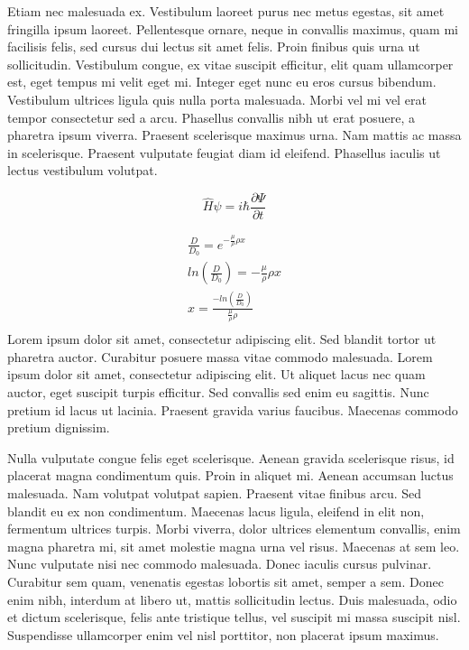 \documentclass[12pt]{article}
\begin{document}
Etiam nec malesuada ex. Vestibulum laoreet purus nec metus egestas, sit amet fringilla ipsum laoreet. Pellentesque ornare, neque in convallis maximus, quam mi facilisis felis, sed cursus dui lectus sit amet felis. Proin finibus quis urna ut sollicitudin. Vestibulum congue, ex vitae suscipit efficitur, elit quam ullamcorper est, eget tempus mi velit eget mi. Integer eget nunc eu eros cursus bibendum. Vestibulum ultrices ligula quis nulla porta malesuada. Morbi vel mi vel erat tempor consectetur sed a arcu. Phasellus convallis nibh ut erat posuere, a pharetra ipsum viverra. Praesent scelerisque maximus urna. Nam mattis ac massa in scelerisque. Praesent vulputate feugiat diam id eleifend. Phasellus iaculis ut lectus vestibulum volutpat.

\begin{equation} %
     \hat{H} \psi = i \hbar \frac{\partial \Psi}{\partial t}
\end{equation}

\begin{align} %
     \frac{D}{D_0} = e^{-\frac{\mu}{\rho}\rho x} \\
    ln\left(\frac{D}{D_0}\right) = -\frac{\mu}{\rho}\rho x \\
    x = \frac{-ln\left(\frac{D}{D_0}\right)}{\frac{\mu}{\rho}\rho} \\
\end{align}
Lorem ipsum dolor sit amet, consectetur adipiscing elit. Sed blandit tortor ut pharetra auctor. Curabitur posuere massa vitae commodo malesuada. Lorem ipsum dolor sit amet, consectetur adipiscing elit. Ut aliquet lacus nec quam auctor, eget suscipit turpis efficitur. Sed convallis sed enim eu sagittis. Nunc pretium id lacus ut lacinia. Praesent gravida varius faucibus. Maecenas commodo pretium dignissim.

Nulla vulputate congue felis eget scelerisque. Aenean gravida scelerisque risus, id placerat magna condimentum quis. Proin in aliquet mi. Aenean accumsan luctus malesuada. Nam volutpat volutpat sapien. Praesent vitae finibus arcu. Sed blandit eu ex non condimentum. Maecenas lacus ligula, eleifend in elit non, fermentum ultrices turpis. Morbi viverra, dolor ultrices elementum convallis, enim magna pharetra mi, sit amet molestie magna urna vel risus. Maecenas at sem leo. Nunc vulputate nisi nec commodo malesuada. Donec iaculis cursus pulvinar. Curabitur sem quam, venenatis egestas lobortis sit amet, semper a sem. Donec enim nibh, interdum at libero ut, mattis sollicitudin lectus. Duis malesuada, odio et dictum scelerisque, felis ante tristique tellus, vel suscipit mi massa suscipit nisl. Suspendisse ullamcorper enim vel nisl porttitor, non placerat ipsum maximus.
\end{document}
